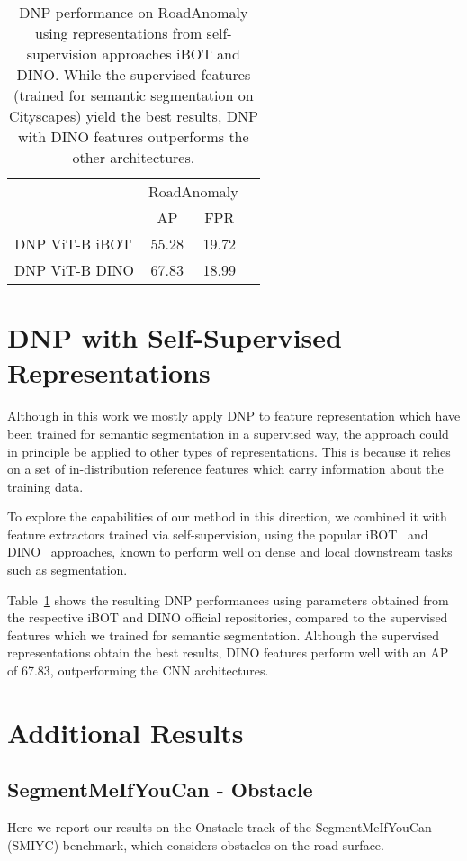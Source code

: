 \documentclass[10pt,twocolumn,letterpaper]{article}
\begin{document}
\begin{table}
\centering
\small
\begin{tabular}{l|ccr}
\toprule
      & \multicolumn{2}{c}{RoadAnomaly}  \\
      & AP   & FPR         \\
        \midrule   
        DNP ViT-B iBOT & 55.28 & 19.72         \\
        DNP ViT-B DINO & 67.83 & 18.99         \\
\bottomrule
\end{tabular}
\caption{DNP performance on RoadAnomaly using representations from self-supervision approaches iBOT and DINO. While the supervised features (trained for semantic segmentation on Cityscapes) yield the best results, DNP with DINO features outperforms the other architectures.}
\label{tab:selfsup}
\end{table}

\section{DNP with Self-Supervised Representations}
Although in this work we mostly apply DNP to feature representation which have been trained for semantic segmentation in a supervised way, the approach could in principle be applied to other types of representations. This is because it relies on a set of in-distribution reference features which carry information about the training data.

To explore the capabilities of our method in this direction, we combined it with feature extractors trained via self-supervision, using the popular iBOT~\cite{zhou2021ibot} and DINO~\cite{caron2021emerging} approaches, known to perform well on dense and local downstream tasks such as segmentation.

Table~\ref{tab:selfsup} shows the resulting DNP performances using parameters obtained from the respective iBOT and DINO official repositories, compared to the supervised features which we trained for semantic segmentation.
Although the supervised representations obtain the best results, DINO features perform well with an AP of 67.83, outperforming the CNN architectures.

\section{Additional Results}
\subsection{SegmentMeIfYouCan - Obstacle}
Here we report our results on the Onstacle track of the SegmentMeIfYouCan (SMIYC) benchmark, which considers obstacles on the road surface.
\end{document}
